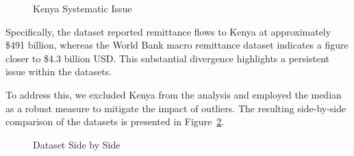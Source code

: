 \documentclass[
  11pt,
]{article}
\begin{document}
\begin{figure}[H]


\caption{\label{fig-kenya-systematic}Kenya Systematic Issue}

\end{figure}%

Specifically, the dataset reported remittance flows to Kenya at
approximately \$491 billion, whereas the World Bank macro remittance
dataset indicates a figure closer to \$4.3 billion USD. This substantial
divergence highlights a persistent issue within the datasets.

To address this, we excluded Kenya from the analysis and employed the
median as a robust measure to mitigate the impact of outliers. The
resulting side-by-side comparison of the datasets is presented in
Figure~\ref{fig-dataset-comparison}.

\begin{figure}[H]


\caption{\label{fig-dataset-comparison}Dataset Side by Side}

\end{figure}%
\end{document}
